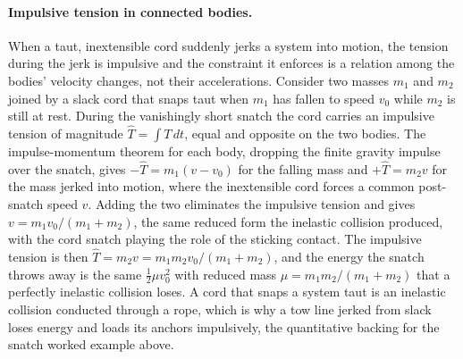 \paragraph{Impulsive tension in connected bodies.} When a taut,
inextensible cord suddenly jerks a system into motion, the tension during
the jerk is impulsive and the constraint it enforces is a relation among
the bodies' velocity changes, not their accelerations. Consider two
masses $m_{1}$ and $m_{2}$ joined by a slack cord that snaps taut when
$m_{1}$ has fallen to speed $v_{0}$ while $m_{2}$ is still at rest. During
the vanishingly short snatch the cord carries an impulsive tension of
magnitude $\hat{T}=\int T\,dt$, equal and opposite on the two bodies. The
impulse-momentum theorem for each body, dropping the finite gravity
impulse over the snatch, gives $-\hat{T}=m_{1}(v-v_{0})$ for the falling
mass and $+\hat{T}=m_{2}v$ for the mass jerked into motion, where the
inextensible cord forces a common post-snatch speed $v$. Adding the two
eliminates the impulsive tension and gives $v=m_{1}v_{0}/(m_{1}+m_{2})$,
the same reduced form the inelastic collision produced, with the cord
snatch playing the role of the sticking contact. The impulsive tension is
then $\hat{T}=m_{2}v=m_{1}m_{2}v_{0}/(m_{1}+m_{2})$, and the energy the
snatch throws away is the same $\tfrac{1}{2}\mu v_{0}^{2}$ with reduced
mass $\mu=m_{1}m_{2}/(m_{1}+m_{2})$ that a perfectly inelastic collision
loses. A cord that snaps a system taut is an inelastic collision
conducted through a rope, which is why a tow line jerked from slack loses
energy and loads its anchors impulsively, the quantitative backing for the
snatch worked example above.

